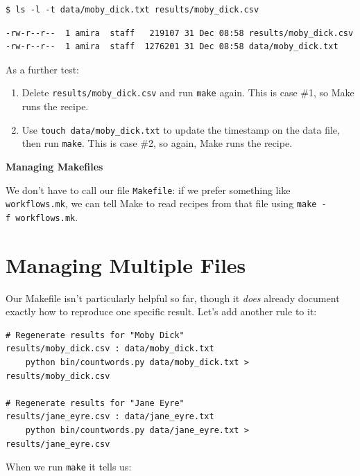 \documentclass[
]{krantz}
\providecommand{\tightlist}{%
  \setlength{\itemsep}{0pt}\setlength{\parskip}{0pt}}
\renewenvironment{quote}{\begin{VF}}{\end{VF}}
\begin{document}
\begin{verbatim}
$ ls -l -t data/moby_dick.txt results/moby_dick.csv
\end{verbatim}

\begin{verbatim}
-rw-r--r--  1 amira  staff   219107 31 Dec 08:58 results/moby_dick.csv
-rw-r--r--  1 amira  staff  1276201 31 Dec 08:58 data/moby_dick.txt
\end{verbatim}

As a further test:

\begin{enumerate}
\def\labelenumi{\arabic{enumi}.}
\tightlist
\item
  Delete \texttt{results/moby\_dick.csv} and run \texttt{make} again.
  This is case \#1, so Make runs the recipe.
\item
  Use \texttt{touch\ data/moby\_dick.txt} to update the timestamp on the data file,
  then run \texttt{make}.
  This is case \#2,
  so again,
  Make runs the recipe.
\end{enumerate}

\begin{quote}
\textbf{Managing Makefiles}

We don't have to call our file \texttt{Makefile}:
if we prefer something like \texttt{workflows.mk},
we can tell Make to read recipes from that file using
\texttt{make\ -f\ workflows.mk}.
\end{quote}

\hypertarget{automate-multiple}{%
\section{Managing Multiple Files}\label{automate-multiple}}

Our Makefile isn't particularly helpful so far,
though it \emph{does} already document exactly how to reproduce one specific result.
Let's add another rule to it:

\begin{verbatim}
# Regenerate results for "Moby Dick"
results/moby_dick.csv : data/moby_dick.txt
    python bin/countwords.py data/moby_dick.txt > results/moby_dick.csv

# Regenerate results for "Jane Eyre"
results/jane_eyre.csv : data/jane_eyre.txt
    python bin/countwords.py data/jane_eyre.txt > results/jane_eyre.csv
\end{verbatim}

When we run \texttt{make} it tells us:
\end{document}
